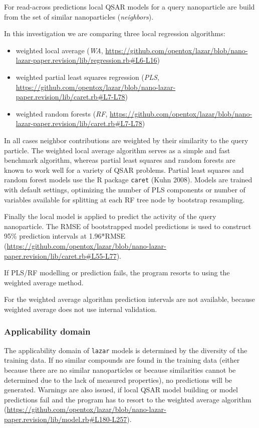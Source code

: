 \documentclass[utf8]{frontiersHLTH} %
\providecommand{\tightlist}{%
  \setlength{\itemsep}{0pt}\setlength{\parskip}{0pt}}
\begin{document}
For read-across predictions local QSAR models for a query nanoparticle
are build from the set of similar nanoparticles (\emph{neighbors}).

In this investigation we are comparing three local regression
algorithms:

\begin{itemize}
\tightlist
\item
  weighted local average (\emph{WA},
  \url{https://github.com/opentox/lazar/blob/nano-lazar-paper.revision/lib/regression.rb\#L6-L16})
\item
  weighted partial least squares regression (\emph{PLS},
  \url{https://github.com/opentox/lazar/blob/nano-lazar-paper.revision/lib/caret.rb\#L7-L78})
\item
  weighted random forests (\emph{RF},
  \url{https://github.com/opentox/lazar/blob/nano-lazar-paper.revision/lib/caret.rb\#L7-L78})
\end{itemize}

In all cases neighbor contributions are weighted by their similarity to
the query particle. The weighted local average algorithm serves as a
simple and fast benchmark algorithm, whereas partial least squares and
random forests are known to work well for a variety of QSAR problems.
Partial least squares and random forest models use the R package
\texttt{caret} (Kuhn 2008). Models are trained with default settings,
optimizing the number of PLS components or number of variables available
for splitting at each RF tree node by bootstrap resampling.

Finally the local model is applied to predict the activity of the query
nanoparticle. The RMSE of bootstrapped model predictions is used to
construct 95\% prediction intervals at 1.96*RMSE
(\url{https://github.com/opentox/lazar/blob/nano-lazar-paper.revision/lib/caret.rb\#L55-L77}).

If PLS/RF modelling or prediction fails, the program resorts to using
the weighted average method.

For the weighted average algorithm prediction intervals are not
available, because weighted average does not use internal validation.

\subsubsection{Applicability domain}\label{applicability-domain}

The applicability domain of \texttt{lazar} models is determined by the
diversity of the training data. If no similar compounds are found in the
training data (either because there are no similar nanoparticles or
because similarities cannot be determined due to the lack of measured
properties), no predictions will be generated. Warnings are also issued,
if local QSAR model building or model predictions fail and the program
has to resort to the weighted average algorithm
(\url{https://github.com/opentox/lazar/blob/nano-lazar-paper.revision/lib/model.rb\#L180-L257}).
\end{document}
